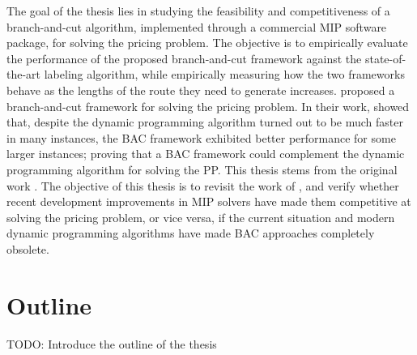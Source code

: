 The goal of the thesis lies in studying the feasibility and competitiveness of a
branch-and-cut algorithm, implemented through a commercial MIP software package,
for solving the pricing problem.
The objective is to empirically evaluate the performance of the proposed
branch-and-cut framework against the state-of-the-art labeling
algorithm, while empirically measuring how the two frameworks behave
as the lengths of the route they need to generate increases.
\cite{jepsen2014} proposed a branch-and-cut framework for solving the pricing problem.
In their work, \citeauthor{jepsen2014} showed that, despite the dynamic programming algorithm
turned out to be much faster in many instances, the BAC framework exhibited
better performance for some larger instances; proving that
a BAC framework could complement the dynamic programming algorithm for solving the PP.
This thesis stems from the original work \citeauthor{jepsen2014}.
The objective of this thesis is to revisit the work of \citeauthor{jepsen2014},
and verify whether recent development improvements in MIP solvers
have made them competitive at solving the pricing problem,
or vice versa,
if the current situation and modern dynamic programming algorithms have
made BAC approaches completely obsolete.



\section{Outline}
\label{sec:intro-outline}

TODO: Introduce the outline of the thesis

